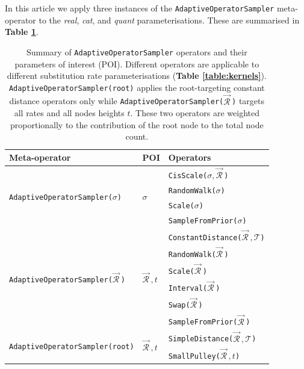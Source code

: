 \documentclass[10pt,letterpaper]{article}
\begin{document}
In this article we apply three instances of the \texttt{AdaptiveOperatorSampler} meta-operator to the \textit{real}, \textit{cat}, and \textit{quant} parameterisations. 
These are summarised in \textbf{Table \ref{table:adaptiveSampling}}.



\begin{table}[h!]
\centering
\begin{tabular}{l l l} 
 Meta-operator & POI & Operators \\
\hline
 \multirow{4}{*}{\texttt{AdaptiveOperatorSampler($\sigma$)}} & \multirow{4}{*}{$\sigma$} & \texttt{CisScale($\sigma, \vec{\mathcal{R}}^{\,}$)} \\ 
 && \texttt{RandomWalk($\sigma$)}  \\
 && \texttt{Scale($\sigma$)}  \\
 && \texttt{SampleFromPrior($\sigma$)}  \\
 \hline
  \multirow{6}{*}{\texttt{AdaptiveOperatorSampler($\vec{\mathcal{R}}^{\,}$)}} & \multirow{6}{*}{$\vec{\mathcal{R}}^{\,}, t$} & \texttt{ConstantDistance($\vec{\mathcal{R}}^{\,}, \mathcal{T}$)}   \\ 
&& \texttt{RandomWalk($\vec{\mathcal{R}}^{\,}$)}  \\
&& \texttt{Scale($\vec{\mathcal{R}}^{\,}$)}   \\
&& \texttt{Interval($\vec{\mathcal{R}}^{\,}$)}   \\
&& \texttt{Swap($\vec{\mathcal{R}}^{\,}$)}  \\
&& \texttt{SampleFromPrior($\vec{\mathcal{R}}^{\,}$)} \\
 \hline
   \multirow{2}{*}{\texttt{AdaptiveOperatorSampler(root)}} & \multirow{2}{*}{$\vec{\mathcal{R}}^{\,}, t$} & \texttt{SimpleDistance($\vec{\mathcal{R}}^{\,}, \mathcal{T}$)}  \\ 
&&  \texttt{SmallPulley($\vec{\mathcal{R}}^{\,}, t$)}  \\
\end{tabular}
\caption{Summary of \texttt{AdaptiveOperatorSampler} operators and their parameters of interest (POI).
Different operators are applicable to different substitution rate parameterisations (\textbf{Table \ref{table:kernels}}). 
\texttt{AdaptiveOperatorSampler(root)} applies the root-targeting constant distance operators only \cite{zhang2020improving} while \texttt{AdaptiveOperatorSampler($\vec{\mathcal{R}}^{\,}$)} targets all rates and all nodes heights $t$. 
These two operators are weighted proportionally to the contribution of the root node to the total node count. }
\label{table:adaptiveSampling}
\end{table}
\end{document}
